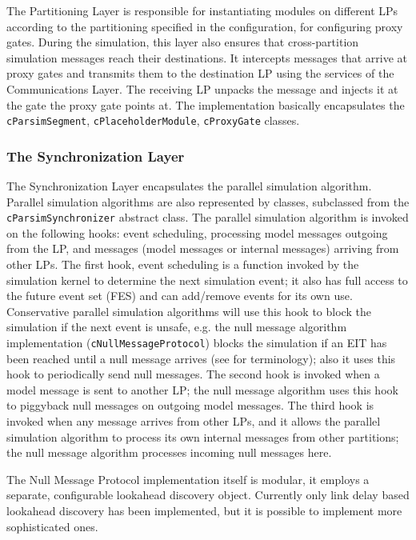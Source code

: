 The Partitioning Layer is responsible for instantiating
modules on different LPs according to the partitioning specified
in the configuration, for configuring proxy gates.
During the simulation, this layer also ensures that cross-partition
simulation messages reach their destinations. It intercepts messages
that arrive at proxy gates and transmits them to the destination LP
using the services of the Communications Layer. The receiving LP
unpacks the message and injects it at the gate the proxy gate points at.
The implementation basically encapsulates the
\texttt{cParsimSegment}, \texttt{cPlaceholderModule},
\texttt{cProxyGate} classes.

\subsubsection{The Synchronization Layer}

The Synchronization Layer encapsulates the parallel
simulation algorithm. Parallel simulation algorithms are also represented
by classes, subclassed from the \texttt{cParsimSynchronizer} abstract class.
The parallel simulation algorithm is invoked on the following hooks:
event scheduling, processing model messages outgoing from the LP,
and messages (model messages or internal messages) arriving
from other LPs. The first hook, event scheduling is a function
invoked by the simulation kernel to determine the next simulation
event; it also has full access to the future event set (FES) and
can add/remove events for its own use.
Conservative parallel simulation algorithms will use this hook
to block the simulation if the next event is unsafe, e.g. the
null message algorithm implementation (\texttt{cNullMessageProtocol})
blocks the simulation if an EIT has been reached until a null message
arrives (see \cite{bagrodia00} for terminology); also it uses
this hook to periodically send null messages. The second hook
is invoked when a model message is sent to another LP;
the null message algorithm uses this hook to piggyback null
messages on outgoing model messages. The third hook is invoked
when any message arrives from other LPs, and it allows the
parallel simulation algorithm to process its own internal messages
from other partitions; the null message algorithm processes
incoming null messages here.

The Null Message Protocol implementation itself is modular,
it employs a separate, configurable lookahead discovery object.
Currently only link delay based lookahead discovery has been
implemented, but it is possible to implement more sophisticated
ones.

